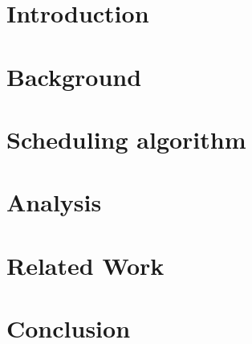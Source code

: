 \documentclass[conference]{IEEEtran}
\begin{document}
\section{Introduction}

\section{Background}

\section{Scheduling algorithm}

\section{Analysis}

\section{Related Work}

\section{Conclusion}


\nocite{*}



\end{document}
